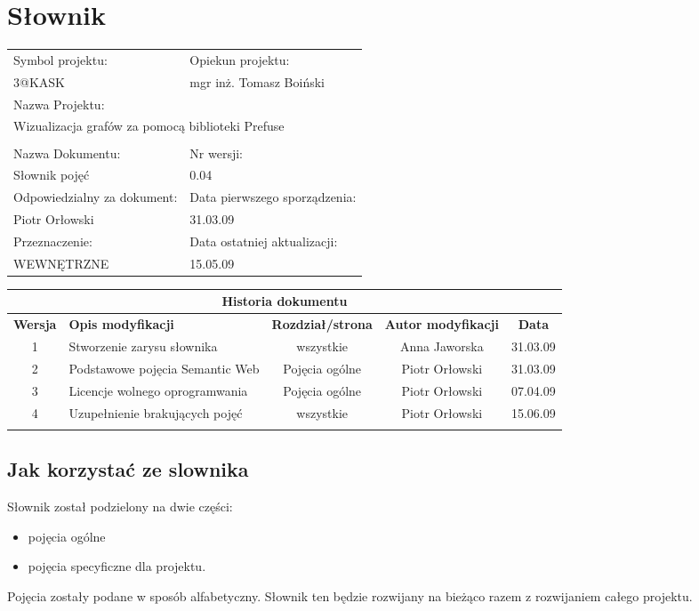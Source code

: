

\section{Słownik}



\begin{center}
\begin{tabular}{|p{7cm}|p{7cm}|}
\hline
Symbol projektu: & Opiekun projektu:   \tabularnewline
3@KASK & mgr inż. Tomasz Boiński    \tabularnewline \hline
\multicolumn{2}{|l|}{Nazwa Projektu: } \tabularnewline
\multicolumn{2}{|l|}{Wizualizacja grafów za pomocą biblioteki Prefuse } \tabularnewline
\hline
\multicolumn{2}{l}{ } \tabularnewline %
\hline
Nazwa Dokumentu: & Nr wersji:   \tabularnewline
Słownik pojęć & 0.04 \tabularnewline \hline
Odpowiedzialny za dokument: & Data pierwszego sporządzenia:   \tabularnewline
Piotr Orłowski & 31.03.09 \tabularnewline \hline
Przeznaczenie: & Data ostatniej aktualizacji:   \tabularnewline
WEWNĘTRZNE & 15.05.09 \tabularnewline \hline
\end{tabular}
\end{center}

\begin{center}
\begin{tabular}{|c|p{4cm}|c|c|c|}
\multicolumn{5}{c}{\textbf{Historia dokumentu}} \tabularnewline \hline
\textbf{Wersja} & \textbf{Opis modyfikacji} & \textbf{Rozdział/strona} & \textbf{Autor modyfikacji} & \textbf{Data} \tabularnewline \hline
1 & Stworzenie zarysu słownika & wszystkie & Anna Jaworska & 31.03.09 \tabularnewline \hline
2 & Podstawowe pojęcia Semantic Web & Pojęcia ogólne & Piotr Orłowski & 31.03.09 \tabularnewline \hline
3 & Licencje wolnego oprogramwania & Pojęcia ogólne & Piotr Orłowski & 07.04.09 \tabularnewline \hline
4 & Uzupełnienie brakujących pojęć & wszystkie & Piotr Orłowski & 15.06.09 \tabularnewline \hline
& & & &\tabularnewline \hline
\end{tabular}
\end{center}



\subsection{Jak korzystać ze slownika}
Słownik został podzielony na dwie części:
\begin{itemize}
 \item pojęcia ogólne
 \item pojęcia specyficzne dla projektu.
\end{itemize}
Pojęcia zostały podane w sposób alfabetyczny. Słownik ten będzie rozwijany na bieżąco razem z rozwijaniem całego projektu.


